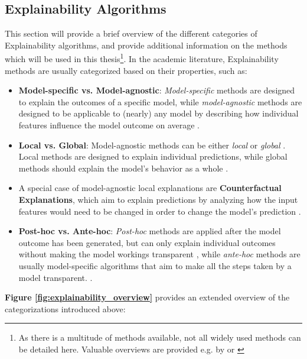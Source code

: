 \subsection{Explainability Algorithms}\label{subsec:algorithms}

This section will provide a brief overview of the different categories of Explainability algorithms, and provide additional information on the methods which will be used in this thesis\footnote{As there is a multitude of methods available, not all widely used methods can be detailed here. Valuable overviews are provided e.g. by \cite{SALEEM2022165} or \cite{Molnar2023}}.
In the academic literature, Explainability methods are usually categorized based on their properties, such as:
\begin{itemize}
    \item \textbf{Model-specific vs. Model-agnostic}: \textit{Model-specific} methods are designed to explain the outcomes of a specific model, while \textit{model-agnostic} methods are designed to be applicable to (nearly) any model by describing how individual features influence the model outcome on average \parencite{Molnar2023}.
    \item \textbf{Local vs. Global}: Model-agnostic methods can be either \textit{local} or \textit{global} \parencite{Molnar2023}. Local methods are designed to explain individual predictions, while global methods should explain the model's behavior as a whole \parencite{SALEEM2022165}.
    \item A special case of model-agnostic local explanations are \textbf{Counterfactual Explanations}, which aim to explain predictions by analyzing how the input features would need to be changed in order to change the model's prediction \parencite{wachter2017}.
    \item \textbf{Post-hoc vs. Ante-hoc}: \textit{Post-hoc} methods are applied after the model outcome has been generated, but can only explain individual outcomes without making the model workings transparent \parencite{Lipton2018}, while \textit{ante-hoc} methods are usually model-specific algorithms that aim to make all the steps taken by a model transparent. \parencite{SALEEM2022165}.
\end{itemize}

\textbf{Figure \ref{fig:explainability_overview}} provides an extended overview of the categorizations introduced above:

